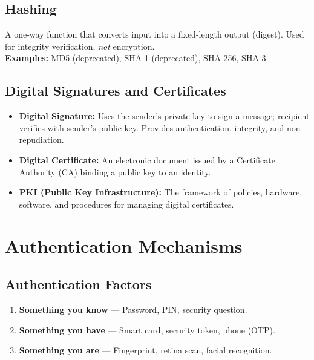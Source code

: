 \documentclass[11pt,a4paper]{article}
\begin{document}
\subsection{Hashing}
\begin{definitionbox}
A one-way function that converts input into a fixed-length output (digest). Used for integrity verification, \emph{not} encryption.\\
\textbf{Examples:} MD5 (deprecated), SHA-1 (deprecated), SHA-256, SHA-3.
\end{definitionbox}

\subsection{Digital Signatures and Certificates}
\begin{itemize}[leftmargin=*]
  \item \textbf{Digital Signature:} Uses the sender's private key to sign a message; recipient verifies with sender's public key. Provides authentication, integrity, and non-repudiation.
  \item \textbf{Digital Certificate:} An electronic document issued by a Certificate Authority (CA) binding a public key to an identity.
  \item \textbf{PKI (Public Key Infrastructure):} The framework of policies, hardware, software, and procedures for managing digital certificates.
\end{itemize}

\section{Authentication Mechanisms}

\subsection{Authentication Factors}
\begin{enumerate}[leftmargin=*]
  \item \textbf{Something you know} --- Password, PIN, security question.
  \item \textbf{Something you have} --- Smart card, security token, phone (OTP).
  \item \textbf{Something you are} --- Fingerprint, retina scan, facial recognition.
\end{enumerate}
\end{document}
